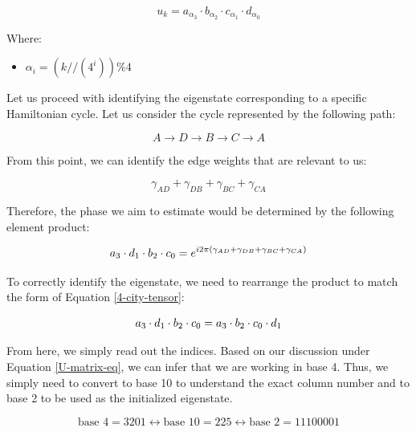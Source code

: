 \documentclass[msc,oneside]{ubcthesis}
\begin{document}
	\begin{equation}\label{4-city-tensor}
		u_{k} = a_{\alpha_{3}}\cdot b _{\alpha_{2}} \cdot c_{\alpha_1} \cdot d_{\alpha_{0}}
	\end{equation}
	
	Where:
	\begin{itemize}
	\item[] $\alpha_i = \left(k//\left(4^{i}\right)\right) \% 4$
	\end{itemize}
	
	Let us proceed with identifying the eigenstate corresponding to a specific Hamiltonian cycle. Let us consider the cycle represented by the following path:
	
	\begin{equation}\label{one-ham-cycle-4-city}
		A \rightarrow D \rightarrow B \rightarrow C \rightarrow A
	\end{equation}
	
	From this point, we can identify the edge weights that are relevant to us:
	
	\begin{equation*}
		\gamma_{AD} + \gamma_{DB} + \gamma_{BC} + \gamma_{CA}
	\end{equation*}
	
	Therefore, the phase we aim to estimate would be determined by the following element product:
	
	\begin{equation*}
		\Large{a_{3} \cdot d_{1} \cdot b_{2} \cdot c_{0} = e^{i2\pi (\gamma_{AD} + \gamma_{DB} + \gamma_{BC} + \gamma_{CA})}}
	\end{equation*}
	
	
	To correctly identify the eigenstate, we need to rearrange the product to match the form of Equation \eqref{4-city-tensor}:
	
	\begin{equation*}
		\Large{a_{3} \cdot d_{1} \cdot b_{2} \cdot c_{0} = \Large{a_{3}} \cdot b_{2} \cdot c_{0}  \cdot d_{1}}
	\end{equation*}
	
	From here, we simply read out the indices. Based on our discussion under Equation \eqref{U-matrix-eq}, we can infer that we are working in base 4. Thus, we simply need to convert to base 10 to understand the exact column number and to base 2 to be used as the initialized eigenstate.
	
	\begin{equation*}
		\text{base } 4 = 3201 \leftrightarrow \text{base } 10 = 225 \leftrightarrow  \text{base } 2 = 11100001
	\end{equation*}
	
\end{document}
